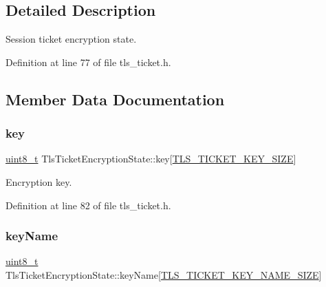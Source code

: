 \subsection{Detailed Description}
Session ticket encryption state. 

Definition at line 77 of file tls\+\_\+ticket.\+h.



\subsection{Member Data Documentation}
\mbox{\label{structTlsTicketEncryptionState_a9305708f5ec5626fde0314ba7627d036}} 
\subsubsection{\texorpdfstring{key}{key}}
{\footnotesize\ttfamily \hyperlink{stdint_8h_aba7bc1797add20fe3efdf37ced1182c5}{uint8\+\_\+t} Tls\+Ticket\+Encryption\+State\+::key\mbox{[}\hyperlink{tls__ticket_8h_a635960598196f4551883147633540063}{T\+L\+S\+\_\+\+T\+I\+C\+K\+E\+T\+\_\+\+K\+E\+Y\+\_\+\+S\+I\+ZE}\mbox{]}}



Encryption key. 



Definition at line 82 of file tls\+\_\+ticket.\+h.

\mbox{\label{structTlsTicketEncryptionState_a0a87a9954a33281e7891644f24924770}} 
\subsubsection{\texorpdfstring{key\+Name}{keyName}}
{\footnotesize\ttfamily \hyperlink{stdint_8h_aba7bc1797add20fe3efdf37ced1182c5}{uint8\+\_\+t} Tls\+Ticket\+Encryption\+State\+::key\+Name\mbox{[}\hyperlink{tls__ticket_8h_a5452f40f64a879b44a635abb2ab07628}{T\+L\+S\+\_\+\+T\+I\+C\+K\+E\+T\+\_\+\+K\+E\+Y\+\_\+\+N\+A\+M\+E\+\_\+\+S\+I\+ZE}\mbox{]}}



